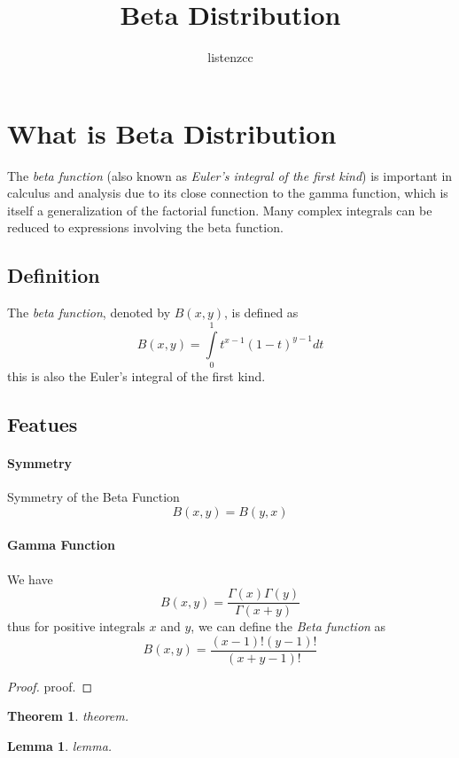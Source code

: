 \documentclass{article}
\title{Beta Distribution}
\author{listenzcc}
\newtheorem{theorem}{Theorem}[section]
\newtheorem{lemma}{Lemma}[section]
\begin{document}
\maketitle
\section{What is Beta Distribution}
The \emph{beta function} (also known as \textit{Euler's integral of the first kind}) is important in calculus and analysis due to its close connection to the gamma function, which is itself a generalization of the factorial function.
Many complex integrals can be reduced to expressions involving the beta function.

\subsection{Definition}
The \emph{beta function}, denoted by \(B(x, y)\), is defined as \[B(x, y) = \int\limits_{0}^{1} t^{x-1} (1-t)^{y-1} dt\]
this is also the Euler's integral of the first kind.

\subsection{Featues}
\paragraph{Symmetry}
Symmetry of the Beta Function \[B(x, y) = B(y, x)\]

\paragraph{Gamma Function}
We have \[B(x, y) = \frac{\Gamma(x)\Gamma(y)}{\Gamma(x+y)}\]
thus for positive integrals $x$ and $y$, we can define the \emph{Beta function} as  \[B(x, y) = \frac{(x-1)!(y-1)!}{(x+y-1)!}\]

\begin{proof}
    proof.
\end{proof}

\begin{theorem}
    theorem.
\end{theorem}

\begin{lemma}
    lemma.
\end{lemma}
\end{document}
